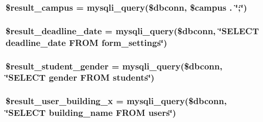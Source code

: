 \hypertarget{index_8php_afdd2ad9cb7726ebdf33d1095eac78a1a}{
\subsubsection[{\$result\-\_\-campus}]{\setlength{\rightskip}{0pt plus 5cm}\$result\-\_\-campus = mysqli\-\_\-query(\$dbconn, \$campus . \char`\"{};\char`\"{})}}\label{index_8php_afdd2ad9cb7726ebdf33d1095eac78a1a}
\hypertarget{index_8php_ad61a3f443fc1856c2ba99dfde9affc8c}{
\subsubsection[{\$result\-\_\-deadline\-\_\-date}]{\setlength{\rightskip}{0pt plus 5cm}\$result\-\_\-deadline\-\_\-date = mysqli\-\_\-query(\$dbconn, \char`\"{}\-S\-E\-L\-E\-C\-T deadline\-\_\-date \-F\-R\-O\-M form\-\_\-settings\char`\"{})}}\label{index_8php_ad61a3f443fc1856c2ba99dfde9affc8c}
\hypertarget{index_8php_adff53f8f2492a44a21e49f4a86980b2e}{
\subsubsection[{\$result\-\_\-student\-\_\-gender}]{\setlength{\rightskip}{0pt plus 5cm}\$result\-\_\-student\-\_\-gender = mysqli\-\_\-query(\$dbconn, \char`\"{}\-S\-E\-L\-E\-C\-T gender \-F\-R\-O\-M students\char`\"{})}}\label{index_8php_adff53f8f2492a44a21e49f4a86980b2e}
\hypertarget{index_8php_ac87f45c9f62c3f0628eef67281f382b3}{
\subsubsection[{\$result\-\_\-user\-\_\-building\-\_\-x}]{\setlength{\rightskip}{0pt plus 5cm}\$result\-\_\-user\-\_\-building\-\_\-x = mysqli\-\_\-query(\$dbconn, \char`\"{}\-S\-E\-L\-E\-C\-T building\-\_\-name \-F\-R\-O\-M users\char`\"{})}}\label{index_8php_ac87f45c9f62c3f0628eef67281f382b3}
